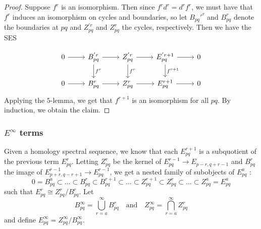 \documentclass[reqno]{amsart}
\theoremstyle{definition}
\theoremstyle{remark}
\begin{document}
    \begin{proof}
        Suppose $f^{r}$ is an isomorphism.
        Then since $f^{r} d^{r} = d^{r} f^{r}$, we must have
        that $f^{r}$ induces an isomorphism on
        cycles and boundaries, so
        let $B_{pq}'^{r}$ and $B_{pq}^{r}$ denote the
        boundaries at $pq$ and
        $Z_{pq}^{'r}$ and $Z_{pq}^{r}$ the cycles, respectively.
        Then we have the SES
        
        \begin{equation*}
        \begin{tikzcd}
            0 \ar[r] & B_{pq}^{'r} \ar[d, "f^{r}"] \ar[r] &
            Z_{pq}^{'r} \ar[r] \ar[d, "f^{r}"] & E_{pq}^{'r+1} \ar[r] 
            \ar[d, "f^{r+1}"] & 0 \\
            0 \ar[r] & B_{pq}^{r} \ar[r] &
            Z_{pq}^{r} \ar[r]  & E_{pq}^{r+1} \ar[r] 
             & 0 
        \end{tikzcd}
        \end{equation*}
        Applying the $5$-lemma, we get that
        $f^{r+1}$ is an isomorphism for
        all $pq$. By induction, 
        we obtain the claim.
    \end{proof}
 
    \subsubsection{$E^{\infty}$ terms}
    
    Given a homology spectral
    sequence, we know that each $E_{pq}^{r+1}$ is a subquotient
    of the previous term $E_{pq}^{r}$. Letting
    $Z_{pq}^{r}$ be the 
    kernel of 
    $E_{pq}^{r-1} \to E_{p-r,q+r-1}$ and
    $B_{pq}^{r}$ the image of
    $E_{p+r,q-r+1}^{r-1} \to E_{pq}^{r-1}$, we get
    a nested family of subobjects of
    $E_{pq}^{a}$ :
    \[
    0 = B_{pq}^{a} \subset \ldots \subset 
    B_{pq}^{r} \subset B_{pq}^{r+1} \subset \ldots
    \subset Z_{pq}^{r+1} \subset Z_{pq}^{r} \subset 
    \ldots \subset Z_{pq}^{a} = E_{pq}^{a}
    \] 
    such that $E_{pq}^{r} \cong
    Z_{pq}^{r} / B_{pq}^{r}$.
    Let
    \[
    B_{pq}^{\infty} = \bigcup_{r=a}^{\infty} B_{pq}^{r}
    \quad \text{and} \quad 
    Z_{pq}^{\infty} =
    \bigcap_{r=a}^{\infty} Z_{pq}^{r}
    \] 
    and define $E_{pq}^{\infty} = 
    Z_{pq}^{\infty} / B_{pq}^{\infty}$.
\end{document}

